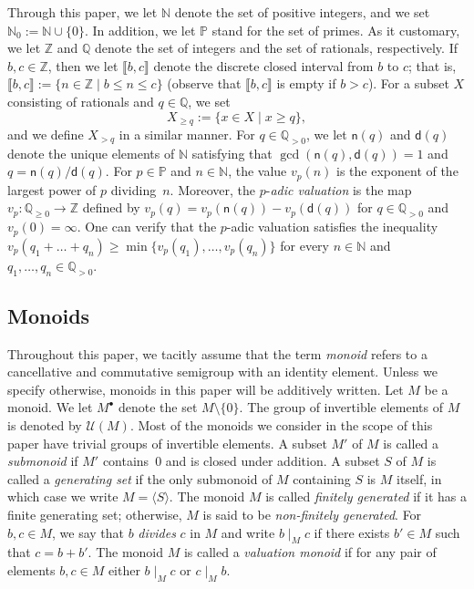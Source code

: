 \documentclass[12pt]{amsart}
\theoremstyle{definition}
\numberwithin{equation}{section}
\newcommand{\nn}{\mathbb{N}}
\newcommand{\pp}{\mathbb{P}}
\newcommand{\qq}{\mathbb{Q}}
\newcommand{\zz}{\mathbb{Z}}
\newcommand{\uu}{\mathcal{U}}
\providecommand\ldb{\llbracket}
\providecommand\rdb{\rrbracket}
\begin{document}
Through this paper, we let $\nn$ denote the set of positive integers, and we set $\nn_0 := \nn \cup \{0\}$. In addition, we let $\pp$ stand for the set of primes. As it customary, we let $\zz$ and $\qq$ denote the set of integers and the set of rationals, respectively. If $b,c \in \zz$, then we let $\ldb b,c \rdb$ denote the discrete closed interval from $b$ to $c$; that is, $\ldb b,c \rdb := \{n \in \zz \mid b \le n \le c\}$ (observe that $\ldb b,c \rdb$ is empty if $b > c$). For a subset $X$ consisting of rationals and $q \in \qq$, we set
\[
	X_{\ge q} := \{x \in X \mid x \ge q\},
\]
and we define $X_{> q}$ in a similar manner. For $q \in \qq_{> 0}$, we let $\mathsf{n}(q)$ and $\mathsf{d}(q)$ denote the unique elements of $\nn$ satisfying that $\gcd(\mathsf{n}(q), \mathsf{d}(q)) = 1$ and $q = \mathsf{n}(q)/\mathsf{d}(q)$. For $p \in \pp$ and $n \in \nn$, the value $v_p(n)$ is the exponent of the largest power of $p$ dividing~$n$. Moreover, the $p$-\emph{adic valuation} is the map $v_p \colon \qq_{\ge 0} \to \zz$ defined by $v_p(q) = v_p(\mathsf{n}(q)) - v_p(\mathsf{d}(q))$ for $q \in \mathbb{Q}_{> 0}$ and $v_p(0) = \infty$. One can verify that the $p$-adic valuation satisfies the inequality $v_p(q_1 + \dots + q_n) \ge \min\{v_p(q_1), \dots, v_p(q_n) \}$ for every $n \in \nn$ and $q_1, \dots, q_n \in \qq_{> 0}$.


\medskip
\subsection{Monoids}

Throughout this paper, we tacitly assume that the term \emph{monoid} refers to a cancellative and commutative semigroup with an identity element. Unless we specify otherwise, monoids in this paper will be additively written. Let $M$ be a monoid. We let $M^\bullet$ denote the set $M \! \setminus \! \{0\}$. The group of invertible elements of $M$ is denoted by $\uu(M)$. Most of the monoids we consider in the scope of this paper have trivial groups of invertible elements.  A subset $M'$ of $M$ is called a \emph{submonoid} if $M'$ contains~$0$ and is closed under addition. A subset $S$ of $M$ is called a \emph{generating set} if the only submonoid of $M$ containing $S$ is $M$ itself, in which case we write $M = \langle S \rangle$. The monoid $M$ is called \emph{finitely generated} if it has a finite generating set; otherwise, $M$ is said to be \emph{non-finitely generated}. For $b,c \in M$, we say that $b$ \emph{divides} $c$ in $M$ and write $b \mid_M c$ if there exists $b' \in M$ such that $c = b + b'$. The monoid $M$ is called a \emph{valuation monoid} if for any pair of elements $b,c \in M$ either $b \mid_M c$ or $c \mid_M b$.
\end{document}
